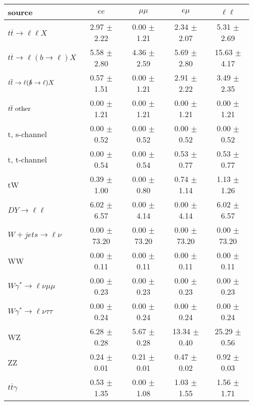 \begin{tabular}{l|cccc} \hline\hline
source & $ee$ & $\mu\mu$ & $e\mu$ & $\ell\ell $ \\
\hline
$t\overline{t} \rightarrow \ell \ell X$ &  2.97 $\pm$  2.22 &  0.00 $\pm$  1.21 &  2.34 $\pm$  2.07 &  5.31 $\pm$  2.69 \\
$t\overline{t} \rightarrow \ell (b \rightarrow \ell) X$ &  5.58 $\pm$  2.80 &  4.36 $\pm$  2.59 &  5.69 $\pm$  2.80 & 15.63 $\pm$  4.17 \\
$t\overline{t} \rightarrow \ell (\slashed b \rightarrow \ell) X$ &  0.57 $\pm$  1.51 &  0.00 $\pm$  1.21 &  2.91 $\pm$  2.22 &  3.49 $\pm$  2.35 \\
        $t\overline{t}\ \rm{other}$ &  0.00 $\pm$  1.21 &  0.00 $\pm$  1.21 &  0.00 $\pm$  1.21 &  0.00 $\pm$  1.21 \\
\hline
                       t, s-channel &  0.00 $\pm$  0.52 &  0.00 $\pm$  0.52 &  0.00 $\pm$  0.52 &  0.00 $\pm$  0.52 \\
                       t, t-channel &  0.00 $\pm$  0.54 &  0.00 $\pm$  0.54 &  0.53 $\pm$  0.77 &  0.53 $\pm$  0.77 \\
                                 tW &  0.39 $\pm$  1.00 &  0.00 $\pm$  0.80 &  0.74 $\pm$  1.14 &  1.13 $\pm$  1.26 \\
\hline
         $DY \rightarrow \ell \ell$ &  6.02 $\pm$  6.57 &  0.00 $\pm$  4.14 &  0.00 $\pm$  4.14 &  6.02 $\pm$  6.57 \\
      $W+jets \rightarrow \ell \nu$ &  0.00 $\pm$ 73.20 &  0.00 $\pm$ 73.20 &  0.00 $\pm$ 73.20 &  0.00 $\pm$ 73.20 \\
                                 WW &  0.00 $\pm$  0.11 &  0.00 $\pm$  0.11 &  0.00 $\pm$  0.11 &  0.00 $\pm$  0.11 \\
\hline
$W\gamma^{*} \rightarrow \ell \nu \mu\mu$ &  0.00 $\pm$  0.23 &  0.00 $\pm$  0.23 &  0.00 $\pm$  0.23 &  0.00 $\pm$  0.23 \\
$W\gamma^{*} \rightarrow \ell \nu \tau\tau$ &  0.00 $\pm$  0.24 &  0.00 $\pm$  0.24 &  0.00 $\pm$  0.24 &  0.00 $\pm$  0.24 \\
                                 WZ &  6.28 $\pm$  0.28 &  5.67 $\pm$  0.28 & 13.34 $\pm$  0.40 & 25.29 $\pm$  0.56 \\
                                 ZZ &  0.24 $\pm$  0.01 &  0.21 $\pm$  0.01 &  0.47 $\pm$  0.02 &  0.92 $\pm$  0.03 \\
\hline
              $t\overline{t}\gamma$ &  0.53 $\pm$  1.35 &  0.00 $\pm$  1.08 &  1.03 $\pm$  1.55 &  1.56 $\pm$  1.71 \\

\end{tabular}
